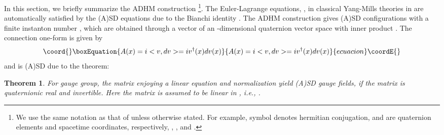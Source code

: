 \documentclass[a4paper,10pt]{article}
\newtheorem{thm}{Theorem}
\providecommand{\ie}{\textit{i.e.}}
\begin{document}
In this section, we briefly summarize the ADHM construction \cite{AHDM,DM,Corri}
\footnote[1]{We use the same notation as that of \cite{KN} unless otherwise stated. For example, symbol \myHighlight{$\dagger$}\coordHE{} denotes hermitian conjugation, \coordHE{} and \coordHE{} are quaternion elements and spacetime coordinates, respectively, \coordHE{}, \coordHE{}, and \coordHE{}.}.
The Euler-Lagrange equations, \coordHE{}, in classical \coordHE{} Yang-Mills theories in \coordHE{} are automatically satisfied by the (A)SD equations \coordHE{} due to the Bianchi identity \coordHE{}.
The ADHM construction gives (A)SD configurations with a finite instanton number \coordHE{}, which are obtained through a vector \coordHE{} of an \coordHE{}-dimensional quaternion vector space \coordHE{} with inner product \coordHE{}.
The connection one-form is given by
\begin{equation}\coord{}\boxEquation{
A(x)=i<v, dv>=iv^\dagger(x)dv(x) \label{eq:A}
}{
A(x)=i<v, dv>=iv^\dagger(x)dv(x) }{ecuacion}\coordE{}\end{equation}
and is (A)SD due to the theorem:
\begin{thm} {\rm \cite{AHDM}} 
For \coordHE{} gauge group, the \coordHE{} matrix \coordHE{} enjoying a linear equation 
\coordHE{} and normalization \coordHE{} yield (A)SD gauge fields, if the matrix \myHighlight{$\Delta^\dagger \Delta$}\coordHE{} is quaternionic real and invertible. Here the \coordHE{} matrix \myHighlight{$\Delta$}\coordHE{} is assumed to be linear in \coordHE{}, \ie, \coordHE{}.
\end{thm}
\end{document}
